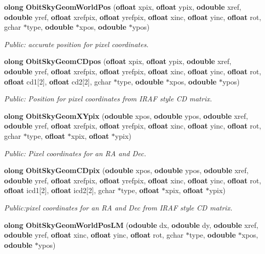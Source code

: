\begin{CompactItemize}
{\bf olong} {\bf Obit\-Sky\-Geom\-World\-Pos} ({\bf ofloat} xpix, {\bf ofloat} ypix, {\bf odouble} xref, {\bf odouble} yref, {\bf ofloat} xrefpix, {\bf ofloat} yrefpix, {\bf ofloat} xinc, {\bf ofloat} yinc, {\bf ofloat} rot, gchar $\ast$type, {\bf odouble} $\ast$xpos, {\bf odouble} $\ast$ypos)
\begin{CompactList}\small\item\em Public: accurate position for pixel coordinates. \item\end{CompactList}\item 
{\bf olong} {\bf Obit\-Sky\-Geom\-CDpos} ({\bf ofloat} xpix, {\bf ofloat} ypix, {\bf odouble} xref, {\bf odouble} yref, {\bf ofloat} xrefpix, {\bf ofloat} yrefpix, {\bf ofloat} xinc, {\bf ofloat} yinc, {\bf ofloat} rot, {\bf ofloat} cd1[2], {\bf ofloat} cd2[2], gchar $\ast$type, {\bf odouble} $\ast$xpos, {\bf odouble} $\ast$ypos)
\begin{CompactList}\small\item\em Public: Position for pixel coordinates from IRAF style CD matrix. \item\end{CompactList}\item 
{\bf olong} {\bf Obit\-Sky\-Geom\-XYpix} ({\bf odouble} xpos, {\bf odouble} ypos, {\bf odouble} xref, {\bf odouble} yref, {\bf ofloat} xrefpix, {\bf ofloat} yrefpix, {\bf ofloat} xinc, {\bf ofloat} yinc, {\bf ofloat} rot, gchar $\ast$type, {\bf ofloat} $\ast$xpix, {\bf ofloat} $\ast$ypix)
\begin{CompactList}\small\item\em Public: Pixel coordinates for an RA and Dec. \item\end{CompactList}\item 
{\bf olong} {\bf Obit\-Sky\-Geom\-CDpix} ({\bf odouble} xpos, {\bf odouble} ypos, {\bf odouble} xref, {\bf odouble} yref, {\bf ofloat} xrefpix, {\bf ofloat} yrefpix, {\bf ofloat} xinc, {\bf ofloat} yinc, {\bf ofloat} rot, {\bf ofloat} icd1[2], {\bf ofloat} icd2[2], gchar $\ast$type, {\bf ofloat} $\ast$xpix, {\bf ofloat} $\ast$ypix)
\begin{CompactList}\small\item\em Public:pixel coordinates for an RA and Dec from IRAF style CD matrix. \item\end{CompactList}\item 
{\bf olong} {\bf Obit\-Sky\-Geom\-World\-Pos\-LM} ({\bf odouble} dx, {\bf odouble} dy, {\bf odouble} xref, {\bf odouble} yref, {\bf ofloat} xinc, {\bf ofloat} yinc, {\bf ofloat} rot, gchar $\ast$type, {\bf odouble} $\ast$xpos, {\bf odouble} $\ast$ypos)

\end{CompactItemize}
